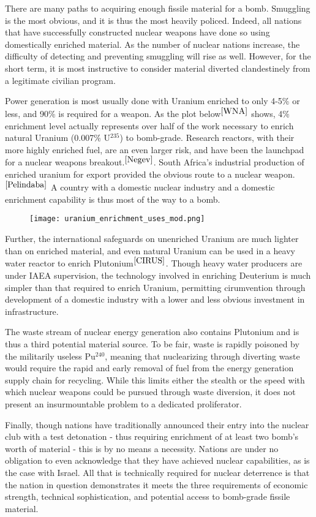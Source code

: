 \documentclass[journal]{IEEEtran}
\begin{document}
There are many paths to acquiring enough fissile material for a bomb.  Smuggling is the most obvious, and it is thus the most heavily policed.  Indeed, all nations that have successfully constructed nuclear weapons have done so using domestically enriched material.  As the number of nuclear nations increase, the difficulty of detecting and preventing smuggling will rise as well.  However, for the short term, it is most instructive to consider material diverted clandestinely from a legitimate civilian program.\par
Power generation is most usually done with Uranium enriched to only 4-5\% or less, and 90\% is required for a weapon.  As the plot below$^{\cite{WNA}}$ shows, 4\% enrichment level actually represents over half of the work necessary to enrich natural Uranium (0.007\% U$^{235}$) to bomb-grade.  Research reactors, with their more highly enriched fuel, are an even larger risk, and have been the launchpad for a nuclear weapons breakout.$^{\cite{Negev}}$.  South Africa's industrial production of enriched uranium for export provided the obvious route to a nuclear weapon.$^{\cite{Pelindaba}}$ A country with a domestic nuclear industry and a domestic enrichment capability is thus most of the way to a bomb.  \par
\begin{figure*}
\texttt{[image: uranium\_enrichment\_uses\_mod.png]}
\end{figure*}
Further, the international safeguards on unenriched Uranium are much lighter than on enriched material, and even natural Uranium can be used in a heavy water reactor to enrich Plutonium$^{\cite{CIRUS}}$.  Though heavy water producers are under IAEA supervision, the technology involved in enriching Deuterium is much simpler than that required to enrich Uranium, permitting cirumvention through development of a domestic industry with a lower and less obvious investment in infrastructure.\par
The waste stream of nuclear energy generation also contains Plutonium and is thus a third potential material source.  To be fair, waste is rapidly poisoned by the militarily useless Pu$^{240}$, meaning that nuclearizing through diverting waste would require the rapid and early removal of fuel from the energy generation supply chain for recycling.  While this limits either the stealth or the speed with which nuclear weapons could be pursued through waste diversion, it does not present an insurmountable problem to a dedicated proliferator.\par
Finally, though nations have traditionally announced their entry into the nuclear club with a test detonation - thus requiring enrichment of at least two bomb's worth of material - this is by no means a necessity.  Nations are under no obligation to even acknowledge that they have achieved nuclear capabilities, as is the case with Israel.  All that is technically required for nuclear deterrence is that the nation in question demonstrates it meets the three requirements of economic strength, technical sophistication, and potential access to bomb-grade fissile material.\par
\end{document}
